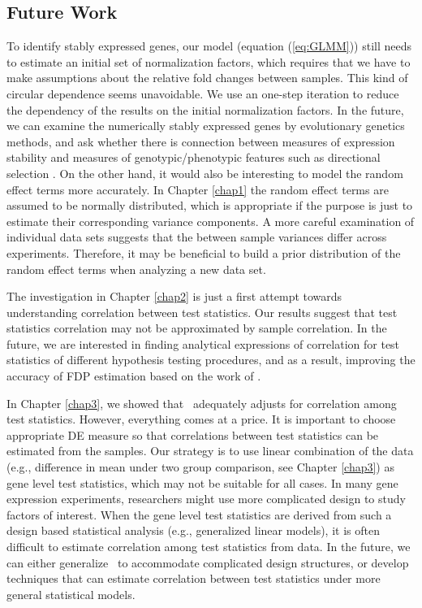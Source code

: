 \subsection{Future Work}
To identify stably expressed genes, our model (equation (\ref{eq:GLMM})) still needs to estimate an 
initial set of normalization factors, which requires that we have to make assumptions about the 
relative fold changes between samples. This kind of circular dependence seems unavoidable. We use 
an one-step iteration to reduce the dependency of the results on the initial normalization factors. 
In the future, we can examine the numerically stably expressed genes by evolutionary genetics 
methods, and ask whether there is connection between measures of expression stability and measures 
of genotypic/phenotypic features such as directional selection \citep{sabeti2006positive}.
On the other hand, it would also be interesting to model the random effect terms more accurately. 
In Chapter \ref{chap1} the random effect terms are assumed to be normally distributed, which is 
appropriate 
if the purpose is just to estimate their corresponding variance components. A more careful 
examination of individual data sets suggests that the between sample variances differ across 
experiments. Therefore, it may be beneficial to build a prior distribution of the random effect 
terms when analyzing a new data set. 

The investigation in Chapter \ref{chap2} is just a first attempt towards understanding correlation 
between  test statistics. Our results suggest that test statistics correlation may not be 
approximated 
by sample correlation. In the future, we are interested in finding analytical expressions of 
correlation for test statistics of different hypothesis testing procedures, and as a result, 
improving the accuracy of FDP estimation based on the work of \citet{efron2007correlation}. 

In Chapter \ref{chap3}, we showed that \OurMethod~adequately adjusts for correlation among test 
statistics. However, everything comes at a price. 
It is important to choose appropriate DE measure so that correlations between test statistics can 
be estimated from the samples. Our strategy is to use linear combination of the data (e.g., 
difference in mean under two group comparison, see Chapter \ref{chap3}) as gene level test 
statistics, which may not be suitable for all cases. In many gene expression experiments, 
researchers  might use more complicated design to study factors of interest.  When the gene level 
test  statistics are derived from such a design based statistical analysis (e.g., generalized 
linear  models), it is often difficult to estimate correlation among test statistics from data. In 
the future, we can either generalize \OurMethod~to accommodate complicated design structures, or 
develop techniques that can estimate correlation between test statistics under 
more general statistical models.  











